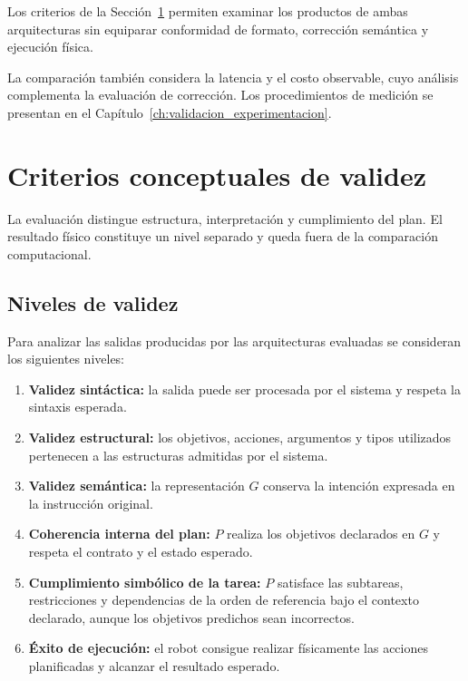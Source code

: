 Los criterios de la Sección~\ref{sec:criterios_validez} permiten examinar los productos de ambas arquitecturas sin equiparar conformidad de formato, corrección semántica y ejecución física.

La comparación también considera la latencia y el costo observable, cuyo análisis complementa la evaluación de corrección. Los procedimientos de medición se presentan en el Capítulo~\ref{ch:validacion_experimentacion}.

\section{Criterios conceptuales de validez}
\label{sec:criterios_validez}

La evaluación distingue estructura, interpretación y cumplimiento del plan. El resultado físico constituye un nivel separado y queda fuera de la comparación computacional.

\subsection{Niveles de validez}
\label{subsec:niveles_validez}

Para analizar las salidas producidas por las arquitecturas evaluadas se
consideran los siguientes niveles:

\begin{enumerate}

    \item \textbf{Validez sintáctica:} la salida puede ser procesada por el
    sistema y respeta la sintaxis esperada.

    \item \textbf{Validez estructural:} los objetivos, acciones, argumentos y
    tipos utilizados pertenecen a las estructuras admitidas por el sistema.

    \item \textbf{Validez semántica:} la representación $G$ conserva la
    intención expresada en la instrucción original.

    \item \textbf{Coherencia interna del plan:} $P$ realiza los objetivos declarados en $G$ y respeta el contrato y el estado esperado.

    \item \textbf{Cumplimiento simbólico de la tarea:} $P$ satisface las subtareas, restricciones y dependencias de la orden de referencia bajo el contexto declarado, aunque los objetivos predichos sean incorrectos.

    \item \textbf{Éxito de ejecución:} el robot consigue realizar físicamente
    las acciones planificadas y alcanzar el resultado esperado.

\end{enumerate}

